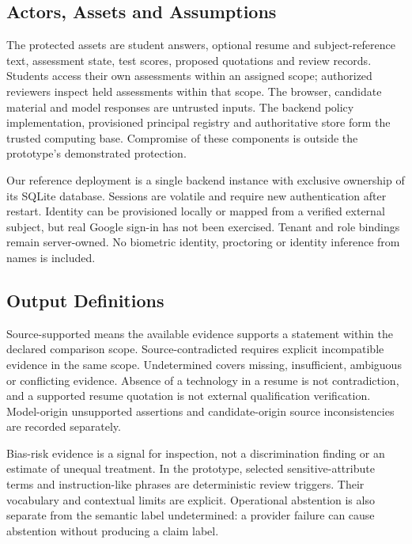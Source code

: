 \documentclass[conference]{IEEEtran}
\begin{document}
\subsection{Actors, Assets and Assumptions}
The protected assets are student answers, optional resume and subject-reference text, assessment state, test scores, proposed quotations and review records. Students access their own assessments within an assigned scope; authorized reviewers inspect held assessments within that scope. The browser, candidate material and model responses are untrusted inputs. The backend policy implementation, provisioned principal registry and authoritative store form the trusted computing base. Compromise of these components is outside the prototype's demonstrated protection.

Our reference deployment is a single backend instance with exclusive ownership of its SQLite database. Sessions are volatile and require new authentication after restart. Identity can be provisioned locally or mapped from a verified external subject, but real Google sign-in has not been exercised. Tenant and role bindings remain server-owned. No biometric identity, proctoring or identity inference from names is included.

\subsection{Output Definitions}
Source-supported means the available evidence supports a statement within the declared comparison scope. Source-contradicted requires explicit incompatible evidence in the same scope. Undetermined covers missing, insufficient, ambiguous or conflicting evidence. Absence of a technology in a resume is not contradiction, and a supported resume quotation is not external qualification verification. Model-origin unsupported assertions and candidate-origin source inconsistencies are recorded separately.

Bias-risk evidence is a signal for inspection, not a discrimination finding or an estimate of unequal treatment. In the prototype, selected sensitive-attribute terms and instruction-like phrases are deterministic review triggers. Their vocabulary and contextual limits are explicit. Operational abstention is also separate from the semantic label undetermined: a provider failure can cause abstention without producing a claim label.
\end{document}
